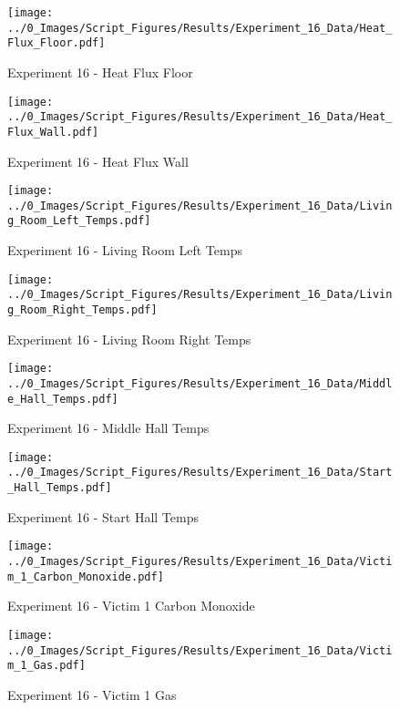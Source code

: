 	\begin{figure}[H]
		\centering
		\texttt{[image: ../0\_Images/Script\_Figures/Results/Experiment\_16\_Data/Heat\_Flux\_Floor.pdf]}
		\caption[]{Experiment 16 - Heat Flux Floor}
	\end{figure}
 
	\clearpage

	\begin{figure}[H]
		\centering
		\texttt{[image: ../0\_Images/Script\_Figures/Results/Experiment\_16\_Data/Heat\_Flux\_Wall.pdf]}
		\caption[]{Experiment 16 - Heat Flux Wall}
	\end{figure}
 

	\begin{figure}[H]
		\centering
		\texttt{[image: ../0\_Images/Script\_Figures/Results/Experiment\_16\_Data/Living\_Room\_Left\_Temps.pdf]}
		\caption[]{Experiment 16 - Living Room Left Temps}
	\end{figure}
 
	\clearpage

	\begin{figure}[H]
		\centering
		\texttt{[image: ../0\_Images/Script\_Figures/Results/Experiment\_16\_Data/Living\_Room\_Right\_Temps.pdf]}
		\caption[]{Experiment 16 - Living Room Right Temps}
	\end{figure}
 

	\begin{figure}[H]
		\centering
		\texttt{[image: ../0\_Images/Script\_Figures/Results/Experiment\_16\_Data/Middle\_Hall\_Temps.pdf]}
		\caption[]{Experiment 16 - Middle Hall Temps}
	\end{figure}
 
	\clearpage

	\begin{figure}[H]
		\centering
		\texttt{[image: ../0\_Images/Script\_Figures/Results/Experiment\_16\_Data/Start\_Hall\_Temps.pdf]}
		\caption[]{Experiment 16 - Start Hall Temps}
	\end{figure}
 

	\begin{figure}[H]
		\centering
		\texttt{[image: ../0\_Images/Script\_Figures/Results/Experiment\_16\_Data/Victim\_1\_Carbon\_Monoxide.pdf]}
		\caption[]{Experiment 16 - Victim 1 Carbon Monoxide}
	\end{figure}
 
	\clearpage

	\begin{figure}[H]
		\centering
		\texttt{[image: ../0\_Images/Script\_Figures/Results/Experiment\_16\_Data/Victim\_1\_Gas.pdf]}
		\caption[]{Experiment 16 - Victim 1 Gas}
	\end{figure}
 

